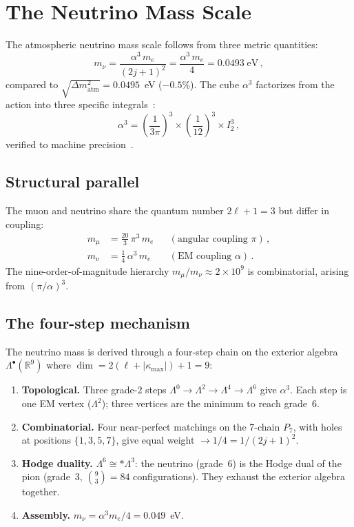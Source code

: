 \documentclass[aps,prd,twocolumn,superscriptaddress,nofootinbib,longbibliography]{revtex4-2}
\newcommand{\kmax}{|\kappa_{\mathrm{max}}|}
\begin{document}
\section{The Neutrino Mass Scale}\label{sec:neutrino}

The atmospheric neutrino mass scale follows from three metric
quantities:
\begin{equation}\label{eq:mnu}
  m_\nu = \frac{\alpha^3\,m_e}{(2j+1)^2}
  = \frac{\alpha^3\,m_e}{4}
  = 0.0493\;\mathrm{eV}\,,
\end{equation}
compared to $\sqrt{\Delta m^2_{\mathrm{atm}}} = 0.0495$~eV
($-0.5\%$).  The cube $\alpha^3$ factorizes from the action into three
specific integrals~\cite{zenodo2025}:
\begin{equation}\label{eq:alpha3}
  \alpha^3 = \left(\frac{1}{3\pi}\right)^{\!3}
    \times \left(\frac{1}{12}\right)^{\!3}
    \times I_2^3\,,
\end{equation}
verified to machine precision~\cite{GellMann1964}.

\subsection{Structural parallel}

The muon and neutrino share the quantum number $2\ell + 1 = 3$ but
differ in coupling:
\begin{align}
  m_\mu &= \frac{20}{3}\,\pi^3\,m_e
    &&(\text{angular coupling }\pi)\,,\\
  m_\nu &= \frac{1}{4}\,\alpha^3\,m_e
    &&(\text{EM coupling }\alpha)\,.
\end{align}
The nine-order-of-magnitude hierarchy $m_\mu/m_\nu \approx 2 \times
10^9$ is combinatorial, arising from $(\pi/\alpha)^3$.

\subsection{The four-step mechanism}

The neutrino mass is derived through a four-step chain on the exterior
algebra $\Lambda^\bullet(\mathbb{R}^9)$ where
$\dim = 2(\ell + \kmax) + 1 = 9$:
\begin{enumerate}
\item \textbf{Topological.}  Three grade-2 steps
  $\Lambda^0 \to \Lambda^2 \to \Lambda^4 \to \Lambda^6$ give
  $\alpha^3$.  Each step is one EM vertex ($\Lambda^2$); three
  vertices are the minimum to reach grade~6.
\item \textbf{Combinatorial.}  Four near-perfect matchings on the
  7-chain $P_7$, with holes at positions $\{1,3,5,7\}$, give equal
  weight $\to 1/4 = 1/(2j+1)^2$.
\item \textbf{Hodge duality.}  $\Lambda^6 \cong {*}\Lambda^3$:
  the neutrino (grade~6) is the Hodge dual of the pion (grade~3,
  $\binom{9}{3} = 84$ configurations).  They exhaust the exterior
  algebra together.
\item \textbf{Assembly.}  $m_\nu = \alpha^3 m_e/4 = 0.049$~eV.
\end{enumerate}
\end{document}
